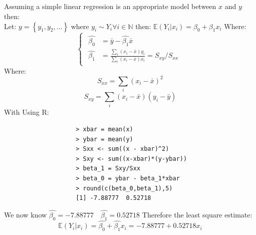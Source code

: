 \documentclass[a4paper]{article}
\begin{document}
	\newpage
	\subsection{}
		Assuming a simple linear regression is an appropriate model between \(x\) and \(y\) then:
			\\Let: \(y = \left\{y_1, y_2, ...\right\}\) where \(y_i \sim Y_i \forall i \in \mathbb{N}\) then:
			 \(\mathbb{E}(Y_i|x_i) = \beta_0 + \beta_1x_i\)
			 Where:
				\[\begin{cases}
					\begin{split}
						\hat{\beta_0} &= \bar{y} - \hat{\beta_1}\bar{x}\\
						\hat{\beta_1} &= \frac{\sum_i (x_i - \bar{x})y_i}{\sum_i (x_i - \bar{x})x_i} = S_{xy}/S_{xx}
					\end{split}
				\end{cases}\]
			Where:
				\[S_{xx} = \sum_i(x_i - \bar{x})^2\]
				\[S_{xy} = \sum_i(x_i - \bar{x})(y_i - \bar{y})\]
			With Using R:
				\begin{verbatim}
					> xbar = mean(x)
					> ybar = mean(y)
					> Sxx <- sum((x - xbar)^2)
					> Sxy <- sum((x-xbar)*(y-ybar))
					> beta_1 = Sxy/Sxx
					> beta_0 = ybar - beta_1*xbar
					> round(c(beta_0,beta_1),5)
					[1] -7.88777  0.52718
				\end{verbatim}
				We now know \(\hat{\beta_0} = -7.88777 \quad \hat{\beta_1} = 0.52718\)
			Therefore the least square estimate:
				\[\mathbb{E}(Y_i|x_i) = \hat{\beta_0} + \hat{\beta_1}x_i = -7.88777 + 0.52718x_i\]
\end{document}

